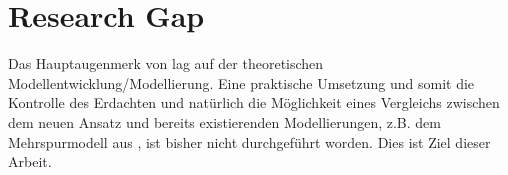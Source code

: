 \section{Research Gap}
\label{sec:researchgap}

Das Hauptaugenmerk von \cite{dat-ba} lag auf der theoretischen Modellentwicklung/Modellierung. 
Eine praktische Umsetzung und somit die Kontrolle des Erdachten und natürlich die Möglichkeit eines Vergleichs zwischen dem neuen Ansatz und bereits existierenden Modellierungen, z.B. dem Mehrspurmodell aus \cite{multi-lane}, ist bisher nicht durchgeführt worden. 
Dies ist Ziel dieser Arbeit.


